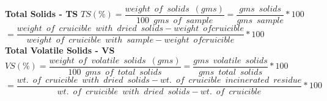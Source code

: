 \vspace{0.4cm}
\textbf{Total Solids - TS}			
\vspace{0.4cm}
$TS(\%)=\dfrac{weight \enspace of \enspace solids \enspace (gms)}{100 \enspace gms \enspace of \enspace sample}=\dfrac{gms \enspace solids}{gms \enspace sample}*100$\\
\vspace{0.3cm}
\hspace{1.2cm}$=\dfrac{weight \enspace of \enspace cruicible \enspace with \enspace dried  \enspace solids - weight \enspace of cruicible}{weight \enspace of \enspace cruicible \enspace with \enspace sample - weight \enspace of cruicible}*100$\\
\vspace{0.4cm}
\textbf{Total Volatile Solids - VS}		
\vspace{0.4cm}
$VS(\%)=\dfrac{weight \enspace of \enspace volatile \enspace solids \enspace (gms)}{100 \enspace gms \enspace of \enspace total \enspace solids}=\dfrac{gms \enspace volatile \enspace solids}{gms \enspace total \enspace solids}*100$\\
\vspace{0.3cm}
\hspace{1.2cm}$=\dfrac{wt. \enspace of \enspace cruicible  \enspace with \enspace dried  \enspace solids - wt. \enspace of \enspace cruicible \enspace incinerated \enspace residue}{wt. \enspace of \enspace cruicible  \enspace with \enspace dried  \enspace solids - wt. \enspace of \enspace cruicible}*100$\\

\newpage
%
